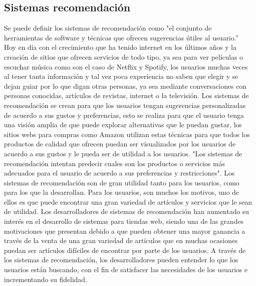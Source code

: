 \documentclass[12pt,letterpaper,openany]{book}
\begin{document}
\subsection{Sistemas recomendación}
Se puede definir los sistemas de recomendación como "el conjunto de herramientas de software y técnicas que ofrecen sugerencias útiles al usuario.” Hoy en día con el crecimiento que ha tenido internet en los últimos años y la creación de sitios que ofrecen servicios de todo tipo, ya sea para ver películas o escuchar música como son el caso de Netflix y Spotify, los usuarios muchas veces al tener tanta información y tal vez poca experiencia no saben que elegir y se dejan guiar por lo que digan otras personas, ya sea mediante conversaciones con personas conocidas, artículos de revistas, internet o la televisión.
\vspace{5mm}\newline
Los sistemas de recomendación se crean para que los usuarios tengan sugerencias personalizadas de acuerdo a sus gustos y preferencias, esto se realiza para que el usuario tenga una visión amplia de que puede explorar alternativas que le puedan gustar, los sitios webs para compras como Amazon utilizan estas técnicas para que todos los productos de calidad que ofrecen puedan ser visualizados por los usuarios de acuerdo a sus gustos y le pueda ser de utilidad a los usuarios. "Los sistemas de recomendación intentan predecir cuales son los productos o servicios más adecuados para el usuario de acuerdo a sus preferencias y restricciones".
\vspace{5mm}\newline
Los sistemas de recomendación son de gran utilidad tanto para los usuarios, como para los que la desarrollan. Para los usuarios, son muchos los motivos, uno de ellos es que puede encontrar una gran variedad de artículos y servicios que le sean de utilidad. Los desarrolladores de sistemas de recomendación han aumentado su interés en el desarrollo de sistemas para tiendas web, siendo una de las grandes motivaciones que presentan debido a que pueden obtener una mayor ganancia a través de la venta de una gran variedad de artículos que en muchas ocasiones puedan ser artículos difíciles de encontrar por parte de los usuarios. 
\vspace{5mm}\newline
A través de los sistemas de recomendación, los desarrolladores pueden entender lo que los usuarios están buscando, con el fin de satisfacer las necesidades de los usuarios e incrementando su fidelidad\cite{13}. 
\vspace{5mm}\newline
\end{document}
